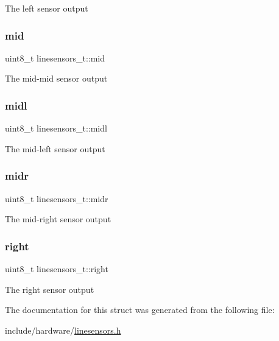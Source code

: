 The left sensor output \mbox{\label{structlinesensors__t_ad9a25cdd83f3ad042741b945b8e33a8c}} 
\subsubsection{\texorpdfstring{mid}{mid}}
{\footnotesize\ttfamily uint8\+\_\+t linesensors\+\_\+t\+::mid}

The mid-\/mid sensor output \mbox{\label{structlinesensors__t_ad6c8d2412227ccbd1e89e27f92e470b1}} 
\subsubsection{\texorpdfstring{midl}{midl}}
{\footnotesize\ttfamily uint8\+\_\+t linesensors\+\_\+t\+::midl}

The mid-\/left sensor output \mbox{\label{structlinesensors__t_a640beadb77352d1a7bdadcb33134a9b5}} 
\subsubsection{\texorpdfstring{midr}{midr}}
{\footnotesize\ttfamily uint8\+\_\+t linesensors\+\_\+t\+::midr}

The mid-\/right sensor output \mbox{\label{structlinesensors__t_ab0c1d5879e4283814d84331c93b63d74}} 
\subsubsection{\texorpdfstring{right}{right}}
{\footnotesize\ttfamily uint8\+\_\+t linesensors\+\_\+t\+::right}

The right sensor output 

The documentation for this struct was generated from the following file\+:\begin{DoxyCompactItemize}
\item 
include/hardware/\hyperlink{linesensors_8h}{linesensors.\+h}\end{DoxyCompactItemize}
